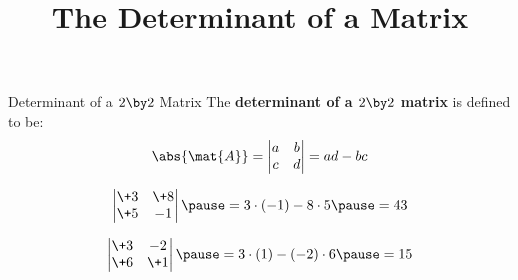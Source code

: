\documentclass{beamer}
\title[MATH 1050 - Section 5.3]{The Determinant of a Matrix}
\begin{document}
\begin{frame}
  \titlepage
\end{frame}

\begin{frame}
\begin{block}{Determinant of a $2 \by 2$ Matrix}
The \textbf{determinant of a $2 \by 2$ matrix} is defined to be:
\begin{equation*}
\abs{\mat{A}} = 
\begin{vmatrix}
a & b \\
c & d
\end{vmatrix}
=ad-bc
\end{equation*}
\end{block}\pause
\begin{example}
\begin{equation*}
\begin{vmatrix}
\+3 & \+8\\
\+5 & -1
\end{vmatrix}\pause
=3\cdot (-1) - 8\cdot 5\pause
=43
\end{equation*}
\end{example}\pause
\begin{example}
\begin{equation*}
\begin{vmatrix}
\+3 &  -2\\
\+6 & \+1
\end{vmatrix}\pause
=3\cdot (1) - (-2)\cdot 6\pause
=15
\end{equation*}
\end{example}
\end{frame}
\end{document}
